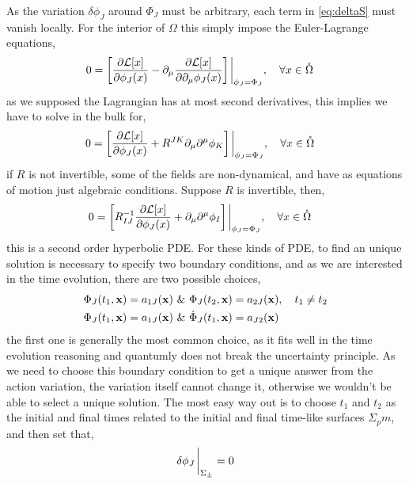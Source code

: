 As the variation $\delta \phi_J$ around $\Phi_J$ must be arbitrary, each term in \cref{eq:deltaS} must vanish locally. For the interior of $\Omega$ this simply impose the Euler-Lagrange equations,
\begin{align}
    0&=\qty[\pdv{\mathcal L[x]}{\phi_J\qty(x)}-\partial_\mu\pdv{\mathcal L[x]}{\partial_\mu\phi_J\qty(x)}]\eval_{\phi_J=\Phi_J},\ \ \ \forall x\in\mathring\Omega
\end{align}
as we supposed the Lagrangian has at most second derivatives, this implies we have to solve in the bulk for,
\begin{align}
    0&=\qty[\pdv{\mathcal L[x]}{\phi_J\qty(x)}+\tensor{R}{^J^K}\partial_\mu\partial^\mu \phi_K]\eval_{\phi_J=\Phi_J},\ \ \ \forall x\in\mathring\Omega
\end{align}
if $R$ is not invertible, some of the fields are non-dynamical, and have as equations of motion just algebraic conditions. Suppose $R$ is invertible, then,
\begin{align}
    0&=\qty[R^{-1}_{IJ}\pdv{\mathcal L[x]}{\phi_J\qty(x)}+\partial_\mu\partial^\mu \phi_I]\eval_{\phi_J=\Phi_J},\ \ \ \forall x\in\mathring\Omega
\end{align}
this is a second order hyperbolic PDE. For these kinds of PDE, to find an unique solution is necessary to specify two boundary conditions, and as we are interested in the 
time evolution, there are two possible choices,
\begin{align}
    \Phi_J\qty(t_1,\vb x) = a_{1J}\qty(\vb x)\ &\&\ \Phi_J\qty(t_2,\vb x) = a_{2J}\qty(\vb x),\ \ \ t_1\neq t_2\\
    \Phi_J\qty(t_1,\vb x) = a_{1J}\qty(\vb x)\ &\&\ \dot \Phi_J\qty(t_1,\vb x) = a_{J2}\qty(\vb x)
\end{align}
the first one is generally the most common choice, as it fits well in the time evolution reasoning and quantumly does not break the uncertainty principle. As we need to choose this boundary condition 
to get a unique answer from the action variation, the variation itself cannot change it, otherwise we wouldn't be able to select a unique solution. The most easy way out is to choose $t_1$ and $t_2$ as 
the initial and final times related to the initial and final time-like surfaces $\Sigma_pm$, and then set that,
\begin{align}
    \delta\phi_J\eval_{\Sigma_{\pm}}=0
\end{align}

